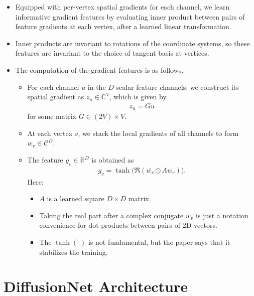 \documentclass[10pt]{article}
\newcommand{\Real}{\mathbb{R}}
\begin{document}
\begin{itemize}
    \item Equipped with per-vertex spatial gradients for each channel, we learn informative gradient features by evaluating inner product between pairs of feature gradients at each vertex, after a learned linear transformation.
    
    \item Inner products are invariant to rotations of the coordinate systems, so these features are invariant to the choice of tangent basis at vertices.
    
    \item The computation of the gradient features is as follows.
    \begin{itemize}
        \item For each channel $u$ in the $D$ scalar feature channels, we construct its spatial gradient as $z_u \in \mathbb{C}^V$, which is given by
        \begin{align*}
            z_u = Gu
        \end{align*}
        for some matrix $G \in (2V) \times V$.

        \item At each vertex $v$, we stack the local gradients of all channels to form $w_v \in \mathcal{C}^{D}$.
        
        \item The feature $g_v \in \Real^D$ is obtained as
        \begin{align*}
            g_v = \tanh\big( \Re(\overline{w_v} \odot A w_v) \big).
        \end{align*}
        Here:
        \begin{itemize}
            \item $A$ is a learned square $D \times D$ matrix.
            
            \item Taking the real part after a complex conjugate $\overline{w_v}$ is just a notation convenience for dot products between pairs of 2D vectors.
            
            \item The $\tanh(\cdot)$ is not fundamental, but the paper says that it stabilizes the training.
        \end{itemize}        
    \end{itemize}
    
\end{itemize}

\section{DiffusionNet Architecture}
\end{document}
